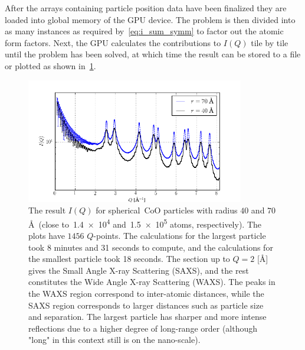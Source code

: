 \documentclass[11pt,twoside]{report}
\newcommand{\chem}[1]{\ensuremath{\mathrm{#1}}}
\begin{document}
\indent After the arrays containing particle position data have been finalized they are loaded into  global memory of the GPU device. The problem is then divided into as many instances as required by~\cref{eq:i_sum_symm} to factor out the atomic form factors.  Next, the GPU calculates the contributions to $I(Q)$ tile by tile until the problem has been solved, at which time the result can be stored to a file or plotted as shown in~\cref{fig:diffractogram_random}. 


\begin{figure}[htbp]
	\begin{center}
		\includegraphics[width=0.85\textwidth]{img/diffractogram_random.png}	
	\end{center}
	\caption{The result $I(Q)$ for spherical~\chem{CoO} particles with radius $40$ and $70$ \AA~(close to~\num{1.4e4} and~\num{1.5e5} atoms, respectively). The plots have $1456$ $Q$-points. The calculations for the largest particle took 8 minutes and 31 seconds to compute, and the calculations for the smallest particle took 18 seconds. The section up to $Q = 2$ [\AA] gives the Small Angle X-ray Scattering (SAXS), and the rest constitutes the Wide Angle X-ray Scattering (WAXS). The peaks in the WAXS region correspond to inter-atomic distances, while the SAXS region corresponds to larger distances such as particle size and separation. The largest particle has sharper and more intense reflections due to a higher degree of long-range order (although "long" in this context still is on the nano-scale). \label{fig:diffractogram_random}}
\end{figure}
\end{document}
